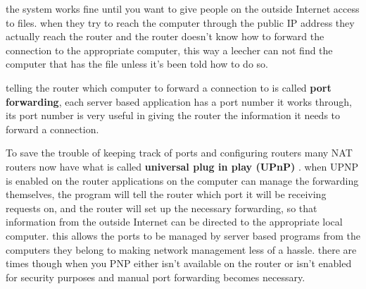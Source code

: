 \documentclass[11pt]{article}
\begin{document}
the system works fine until you want to give people on the outside Internet
access to files. when they try to reach the computer through the public IP address they actually reach the router and the router doesn't know how to forward the connection to the appropriate computer, this way a leecher can not find the computer that has the file
unless it's been told how to do so. 

telling the router which computer to forward a connection to is called \textbf{port forwarding}, each server based application has a port number it works through, its port number is very useful in giving the router the information it needs to forward a connection. 

To save the trouble of keeping track of ports and configuring routers many NAT routers now have what is called \textbf{universal plug in play (UPnP)} . when UPNP is enabled on the router applications on the computer can manage the forwarding themselves, the program will tell the router which port it will be receiving requests on, and the router will set up the necessary forwarding, so that information from the outside Internet can be directed to the appropriate local computer. this allows the ports to be managed by server based programs from the computers they belong to making network management less of a hassle. there are times though when you PNP either isn't available on the router or isn't enabled for security purposes and manual port forwarding becomes necessary.
\end{document}
